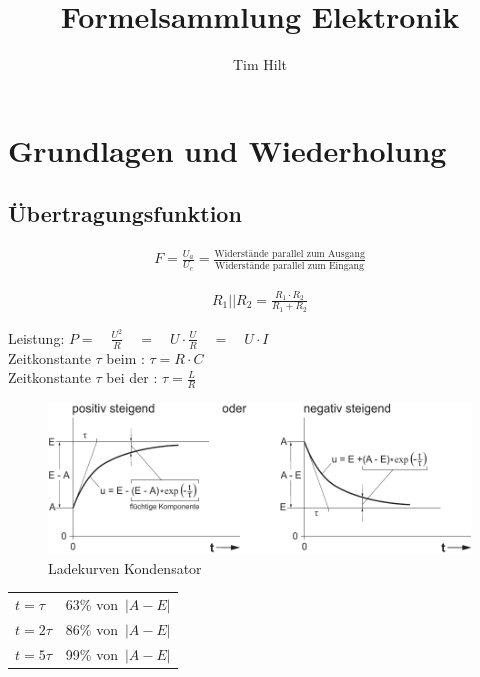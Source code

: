 \documentclass[a5paper, 11pt]{scrartcl}
\title{Formelsammlung Elektronik}
\author{Tim Hilt}
\begin{document}
\maketitle

\section{Grundlagen und Wiederholung}

\subsection{Übertragungsfunktion}
\begin{align*}
  F = \frac{U_a}{U_e} = \frac{\text{Widerstände parallel zum Ausgang}}{\text{Widerstände parallel zum Eingang}}
\end{align*}


\begin{align*}
  R_1 || R_2 = \frac{R_1 \cdot R_2}{R_1 + R_2}
\end{align*}

Leistung: \dotfill \(P = \quad \frac{U^2}{R} \quad = \quad U \cdot \frac{U}{R} \quad = \quad U \cdot I\)\\
Zeitkonstante \(\tau\) beim : \dotfill \(\tau = R \cdot C\)\\
Zeitkonstante \(\tau\) bei der : \dotfill \(\tau = \frac{L}{R}\)\\

\begin{figure}[H]
  \centering
  \includegraphics[width=.8\textwidth]{LadekurveKondensator}
  \caption{Ladekurven Kondensator}
\end{figure}

\begin{center}
\begin{tabular}{ll}
  \toprule
  \(t=\tau\) & 63\% von\ \(|A-E|\)\\
  \(t=2\tau\) & 86\% von\ \(|A-E|\)\\
  \(t=5\tau\) & 99\% von\ \(|A-E|\)\\
  \bottomrule
\end{tabular}
\end{center}
\end{document}
